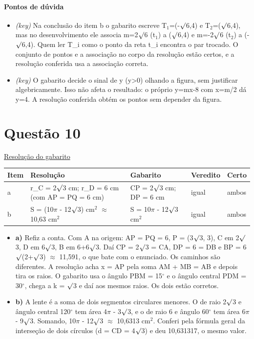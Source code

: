 \documentclass{article}%
\begin{document}
\paragraph{Pontos de dúvida}%
\begin{itemize}%
\item%
\textit{(key)} Na conclusão do item b o gabarito escreve T$_{1}$=(-$\surd$6,4) e T$_{2}$=($\surd$6,4), mas no desenvolvimento ele associa m=2$\surd$6 (t$_{1}$) a ($\surd$6,4) e m=-2$\surd$6 (t$_{2}$) a (-$\surd$6,4). Quem ler T\_i como o ponto da reta t\_i encontra o par trocado. O conjunto de pontos e a associação no corpo da resolução estão certos, e a resolução conferida usa a associação correta.%
\item%
\textit{(key)} O gabarito decide o sinal de y (y>0) olhando a figura, sem justificar algebricamente. Isso não afeta o resultado: o próprio y=mx-8 com x=m/2 dá y=4. A resolução conferida obtém os pontos sem depender da figura.%
\end{itemize}%
\section*{Questão 10}%
\href{https://poliedroresolve.sistemapoliedro.com.br/vestibulares/ita/2026/ita-2-fase-dia-1-28-10-2025-2-fase-dia-1/dissertativa-10-matematica-2-fase-dia-1-ita-2026}{Resolução do gabarito}\par\smallskip%
\begin{longtable}{@{}p{} p{} p{} p{} p{}@{}}\toprule Item & Resolução & Gabarito & Veredito & Certo \\ \midrule
a & r\_C = 2$\surd$3 cm; r\_D = 6 cm (com AP = PQ = 6 cm) & CP = 2$\surd$3 cm; DP = 6 cm & igual & ambos \\
b & S = (10$\pi$ - 12$\surd$3) cm$^2$ $\approx$ 10,63 cm$^2$ & S = 10$\pi$ - 12$\surd$3 cm$^2$ & igual & ambos \\
\bottomrule\end{longtable}%
\begin{itemize}%
\item%
\textbf{a)} Refiz a conta. Com A na origem: AP = PQ = 6, P = (3$\surd$3, 3), C em 2$\surd$3, D em 6$\surd$3, B em 6+6$\surd$3. Daí CP = 2$\surd$3 = CA, DP = 6 = DB e BP = 6$\surd$(2+$\surd$3) $\approx$ 11,591, o que bate com o enunciado. Os caminhos são diferentes. A resolução acha x = AP pela soma AM + MB = AB e depois tira os raios. O gabarito usa o ângulo PBM = 15$^\circ$ e o ângulo central PDM = 30$^\circ$, chega a k = $\surd$3 e daí aos mesmos raios. Os dois estão corretos.%
\item%
\textbf{b)} A lente é a soma de dois segmentos circulares menores. O de raio 2$\surd$3 e ângulo central 120$^\circ$ tem área 4$\pi$ - 3$\surd$3, e o de raio 6 e ângulo 60$^\circ$ tem área 6$\pi$ - 9$\surd$3. Somando, 10$\pi$ - 12$\surd$3 $\approx$ 10,6313 cm$^2$. Conferi pela fórmula geral da interseção de dois círculos (d = CD = 4$\surd$3) e deu 10,631317, o mesmo valor.%
\end{itemize}%
\end{document}
